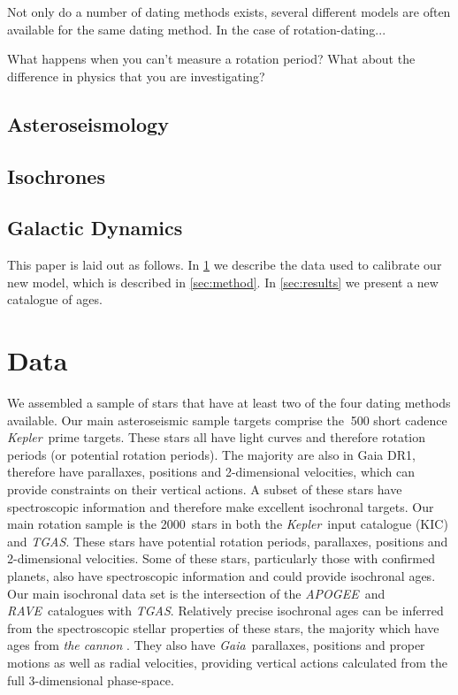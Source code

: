 \documentclass[useAMS, usenatbib, preprint, 12pt]{aastex}
\newcommand{\racomment}[1]{{\color{red}#1}}
\newcommand{\Kepler}{{\it Kepler}}
\newcommand{\kepler}{\Kepler}
\newcommand{\TGAS}{{\it TGAS}}
\newcommand{\tgas}{{\it TGAS}}
\newcommand{\apogee}{{\it APOGEE}}
\newcommand{\gaia}{{\it Gaia}}
\newcommand{\rave}{{\it RAVE}}
\newcommand{\nkictgas}{2000}
\begin{document}
Not only do a number of dating methods exists, several different models are
often available for the same dating method.
In the case of rotation-dating...

\racomment{What happens when you can't measure a rotation period?}
\racomment{What about the difference in physics that you are investigating?}

\subsection{Asteroseismology}

\subsection{Isochrones}

\subsection{Galactic Dynamics}

This paper is laid out as follows.
In \textsection \ref{sec:data} we describe the data used to calibrate our new
model, which is described in \textsection \ref{sec:method}.
In \textsection \ref{sec:results} we present a new catalogue of ages.

\section{Data}
\label{sec:data}
We assembled a sample of stars that have at least two of the four dating
methods available.
Our main asteroseismic sample targets comprise the $~$500 short cadence
\kepler\ prime targets.
These stars all have light curves and therefore rotation periods (or potential
rotation periods).
The majority are also in Gaia DR1, therefore have parallaxes, positions and
2-dimensional velocities, which can provide constraints on their vertical
actions.
A subset of these stars have spectroscopic information and therefore make
excellent isochronal targets.
Our main rotation sample is the \nkictgas\ stars in both the \kepler\ input
catalogue (KIC) and \TGAS.
These stars have potential rotation periods, parallaxes, positions and
2-dimensional velocities.
Some of these stars, particularly those with confirmed planets, also have
spectroscopic information and could provide isochronal ages.
Our main isochronal data set is the intersection of the \apogee\ and \rave\
catalogues with \tgas.
Relatively precise isochronal ages can be inferred from the spectroscopic
stellar properties of these stars, the majority which have ages from {\it the
cannon} \citep{Ness2015, Casey2016}.
They also have \gaia\ parallaxes, positions and proper motions as well as
radial velocities, providing vertical actions calculated from the full
3-dimensional phase-space.
\end{document}
